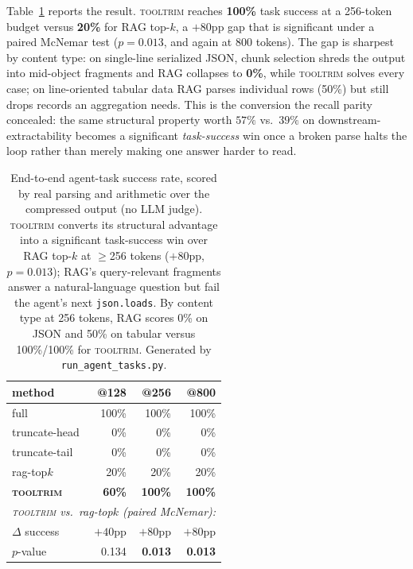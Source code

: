 \documentclass[11pt]{article}
\newcommand{\tooltrim}{\textsc{tooltrim}}
\begin{document}
Table~\ref{tab:agenttasks} reports the result. \tooltrim{} reaches
\textbf{100\%} task success at a 256-token budget versus \textbf{20\%} for RAG
top-$k$, a $+80$pp gap that is significant under a paired McNemar test
($p{=}0.013$, and again at 800 tokens). The gap is sharpest by content type: on
single-line serialized JSON, chunk selection shreds the output into mid-object
fragments and RAG collapses to \textbf{0\%}, while \tooltrim{} solves every case;
on line-oriented tabular data RAG parses individual rows (50\%) but still drops
records an aggregation needs. This is the conversion the recall parity concealed:
the same structural property worth $57\%$ vs.\ $39\%$ on downstream-extractability
becomes a significant \emph{task-success} win once a broken parse halts the loop
rather than merely making one answer harder to read.

\begin{table}[t]
\centering
\begin{tabular}{lrrr}
\toprule
method & @128 & @256 & @800 \\
\midrule
full           & 100\% & 100\% & 100\% \\
truncate-head  & 0\%   & 0\%   & 0\%   \\
truncate-tail  & 0\%   & 0\%   & 0\%   \\
rag-top$k$     & 20\%  & 20\%  & 20\%  \\
\textbf{\tooltrim} & \textbf{60\%} & \textbf{100\%} & \textbf{100\%} \\
\midrule
\multicolumn{4}{l}{\emph{\tooltrim{} vs.\ rag-top$k$ (paired McNemar):}} \\
$\Delta$ success & $+40$pp & $+80$pp & $+80$pp \\
$p$-value        & 0.134   & \textbf{0.013} & \textbf{0.013} \\
\bottomrule
\end{tabular}
\caption{End-to-end agent-task success rate, scored by real parsing and
arithmetic over the compressed output (no LLM judge). \tooltrim{} converts its
structural advantage into a significant task-success win over RAG top-$k$ at
$\geq$256 tokens ($+80$pp, $p{=}0.013$); RAG's query-relevant fragments answer a
natural-language question but fail the agent's next \texttt{json.loads}. By
content type at 256 tokens, RAG scores 0\% on JSON and 50\% on tabular versus
100\%/100\% for \tooltrim{}. Generated by \texttt{run\_agent\_tasks.py}.}
\label{tab:agenttasks}
\end{table}
\end{document}
